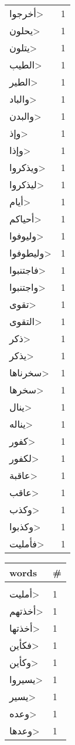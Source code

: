 \documentclass{article}
\begin{document}
\begin{multicols}{6}
\begin{center}
\begin{tabular}{ P{2cm}  P{1cm}}
\<أخرجوا> & 1 \\ 
\<يحلون> & 1 \\ 
\<يتلون> & 1 \\ 
\<الطيب> & 1 \\ 
\<الطير> & 1 \\ 
\<والباد> & 1 \\ 
\<والبدن> & 1 \\ 
\<وإذ> & 1 \\ 
\<وإذا> & 1 \\ 
\<ويذكروا> & 1 \\ 
\<ليذكروا> & 1 \\ 
\<أيام> & 1 \\ 
\<أحياكم> & 1 \\ 
\<وليوفوا> & 1 \\ 
\<وليطوفوا> & 1 \\ 
\<فاجتنبوا> & 1 \\ 
\<واجتنبوا> & 1 \\ 
\<تقوى> & 1 \\ 
\<التقوى> & 1 \\ 
\<ذكر> & 1 \\ 
\<يذكر> & 1 \\ 
\<سخرناها> & 1 \\ 
\<سخرها> & 1 \\ 
\<ينال> & 1 \\ 
\<يناله> & 1 \\ 
\<كفور> & 1 \\ 
\<لكفور> & 1 \\ 
\<عاقبة> & 1 \\ 
\<عاقب> & 1 \\ 
\<وكذب> & 1 \\ 
\<وكذبوا> & 1 \\ 
\<فأمليت> & 1 \\ 
\end{tabular} 
\begin{tabular}{ P{2cm}  P{1cm}} 
\textbf{words}    & \textbf{\#}  \\
\hline
\\[0.01cm]
\<أمليت> & 1 \\ 
\<أخذتهم> & 1 \\ 
\<أخذتها> & 1 \\ 
\<فكأين> & 1 \\ 
\<وكأين> & 1 \\ 
\<يسيروا> & 1 \\ 
\<يسير> & 1 \\ 
\<وعده> & 1 \\ 
\<وعدها> & 1 \\ 

\end{tabular}
\end{center}
\end{multicols}
\end{document}
